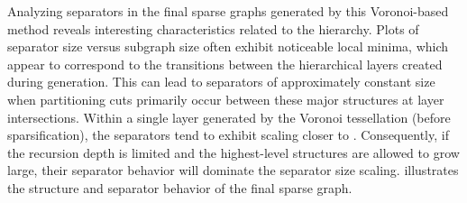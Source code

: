 Analyzing separators in the final sparse graphs generated by this Voronoi-based method reveals interesting characteristics related to the hierarchy.
Plots of separator size versus subgraph size often exhibit noticeable local minima, which appear to correspond to the transitions between the hierarchical layers created during generation.
This can lead to separators of approximately constant size when partitioning cuts primarily occur between these major structures at layer intersections.
Within a single layer generated by the Voronoi tessellation (before sparsification), the separators tend to exhibit scaling closer to .
Consequently, if the recursion depth is limited and the highest-level structures are allowed to grow large, their  separator behavior will dominate the separator size scaling.
 illustrates the structure and separator behavior of the final sparse graph.

